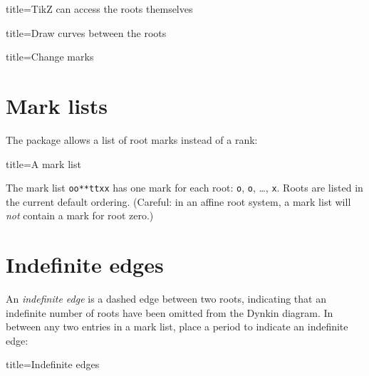 \documentclass{amsart}
\begin{document}
\begin{tcblisting}{title={TikZ can access the roots themselves}}
\end{tcblisting}
\begin{tcblisting}{title={Draw curves between the roots}}
\end{tcblisting}
\begin{tcblisting}{title={Change marks}}
\end{tcblisting}


\section{Mark lists}

The package allows a list of root marks instead of a rank:

\begin{tcblisting}{title={A mark list}}
\end{tcblisting}
The mark list \verb!oo**ttxx! has one mark for each root: \verb!o!, \verb!o!, \dots, \verb!x!.
Roots are listed in the current default ordering.
(Careful: in an affine root system, a mark list will \emph{not} contain a mark for root zero.)


\section{Indefinite edges}

An \emph{indefinite edge} is a dashed edge between two roots,  indicating that an indefinite number of roots have been omitted from the Dynkin diagram.
In between any two entries in a mark list, place a period to indicate an indefinite edge:
\begin{tcblisting}{title={Indefinite edges}}
\end{tcblisting}
\end{document}
